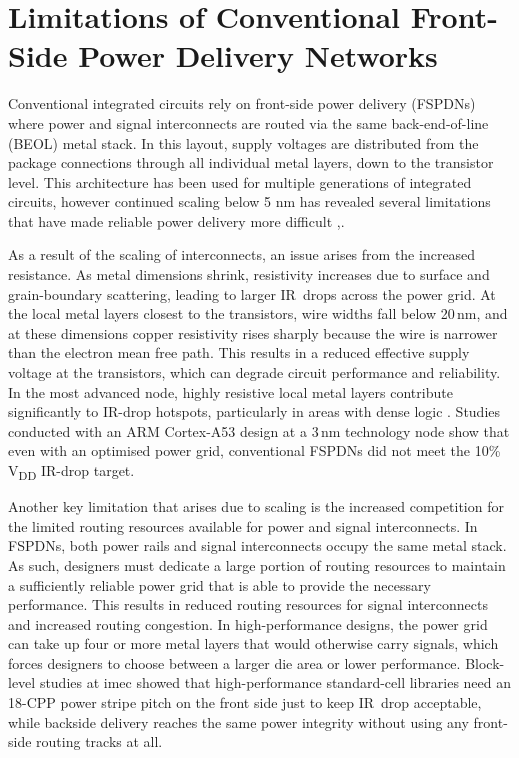\section{Limitations of Conventional Front-Side Power Delivery Networks}

Conventional integrated circuits rely on front-side power delivery (FSPDNs) where power and signal interconnects are routed via the same back-end-of-line (BEOL) metal stack. In this layout, supply voltages are distributed from the package connections through all individual metal layers, down to the transistor level. This architecture has been used for multiple generations of integrated circuits, however continued scaling below 5 nm has revealed several limitations that have made reliable power delivery more difficult \cite{9817394},\cite{10244504}. 

As a result of the scaling of interconnects, an issue arises from the increased resistance. As metal dimensions shrink, resistivity increases due to surface and grain-boundary scattering, leading to larger IR~drops across the power grid\cite{8993617}. At the local metal layers closest to the transistors, wire widths fall below 20\,nm, and at these dimensions copper resistivity rises sharply because the wire is narrower than the electron mean free path\cite{8932458}. This results in a reduced effective supply voltage at the transistors, which can degrade circuit performance and reliability. In the most advanced node, highly resistive local metal layers contribute significantly to IR-drop hotspots, particularly in areas with dense logic \cite{8993617}. Studies conducted with an ARM Cortex-A53 design at a 3\,nm technology node show that even with an optimised power grid, conventional FSPDNs did not meet the 10\% V\textsubscript{DD} IR-drop target\cite{9817394}.

Another key limitation that arises due to scaling is the increased competition for the limited routing resources available for power and signal interconnects. In FSPDNs, both power rails and signal interconnects occupy the same metal stack. As such, designers must dedicate a large portion of routing resources to maintain a sufficiently reliable power grid that is able to provide the necessary performance. This results in reduced routing resources for signal interconnects and increased routing congestion. In high-performance designs, the power grid can take up four or more metal layers that would otherwise carry signals, which forces designers to choose between a larger die area or lower performance\cite{10631463}. Block-level studies at imec showed that high-performance standard-cell libraries need an 18-CPP power stripe pitch on the front side just to keep IR~drop acceptable, while backside delivery reaches the same power integrity without using any front-side routing tracks at all\cite{10631463}.

